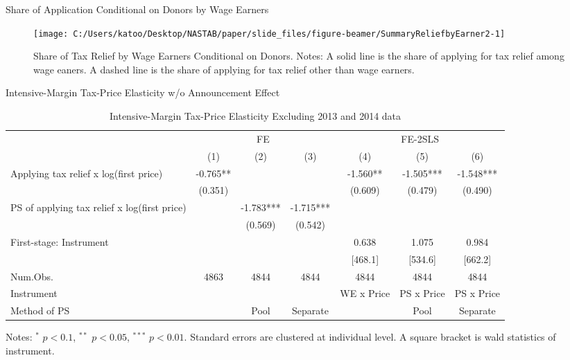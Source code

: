 \documentclass[
  ignorenonframetext,
  aspectratio=169,
]{beamer}
\begin{document}
\begin{frame}{Share of Application Conditional on Donors by Wage Earners}
\protect\hypertarget{share-of-application-conditional-on-donors-by-wage-earners}{}
\begin{figure}[t]

{\centering \texttt{[image: C:/Users/katoo/Desktop/NASTAB/paper/slide\_files/figure-beamer/SummaryReliefbyEarner2-1]} 

}

\caption{Share of Tax Relief by Wage Earners Conditional on Donors. Notes: A solid line is the share of applying for tax relief among wage eaners. A dashed line is the share of applying for tax relief other than wage earners.}\label{fig:SummaryReliefbyEarner2}
\end{figure}
\end{frame}

\begin{frame}{Intensive-Margin Tax-Price Elasticity w/o Announcement Effect}
\protect\hypertarget{intensive-margin-tax-price-elasticity-wo-announcement-effect}{}
\begin{table}

\caption{\label{tab:WoAnnoucementIntensive}Intensive-Margin Tax-Price Elasticity Excluding 2013 and 2014 data}
\centering
\fontsize{7}{9}\selectfont
\begin{threeparttable}
\begin{tabular}[t]{lcccccc}
\toprule
\multicolumn{1}{c}{ } & \multicolumn{3}{c}{FE} & \multicolumn{3}{c}{FE-2SLS} \\
\cmidrule(l{3pt}r{3pt}){2-4} \cmidrule(l{3pt}r{3pt}){5-7}
  & (1) & (2) & (3) & (4) & (5) & (6)\\
\midrule
Applying tax relief x log(first price) & -0.765** &  &  & -1.560** & -1.505*** & -1.548***\\
 & (0.351) &  &  & (0.609) & (0.479) & (0.490)\\
PS of applying tax relief x log(first price) &  & -1.783*** & -1.715*** &  &  & \\
 &  & (0.569) & (0.542) &  &  & \\
\midrule
First-stage: Instrument &  &  &  & 0.638 & 1.075 & 0.984\\
 &  &  &  & [468.1] & [534.6] & [662.2]\\
Num.Obs. & 4863 & 4844 & 4844 & 4844 & 4844 & 4844\\
Instrument &  &  &  & WE x Price & PS x Price & PS x Price\\
Method of PS &  & Pool & Separate &  & Pool & Separate\\
\bottomrule
\end{tabular}
\begin{tablenotes}
\item Notes: $^{*}$ $p < 0.1$, $^{**}$ $p < 0.05$, $^{***}$ $p < 0.01$. Standard errors are clustered at individual level. A square bracket is wald statistics of instrument.
\end{tablenotes}
\end{threeparttable}
\end{table}
\end{frame}
\end{document}
